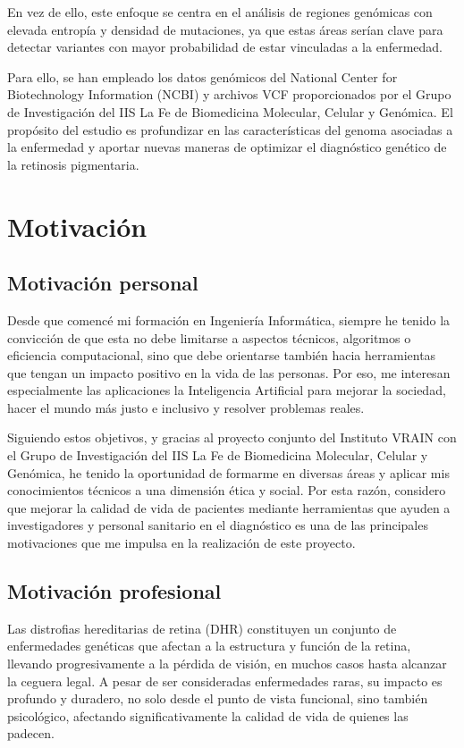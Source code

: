 \documentclass[11pt,spanish,listoffigures,listoftables]{tfgetsinf}
\begin{document}
 

En vez de ello, este enfoque se centra en el análisis de regiones genómicas con elevada entropía y densidad de mutaciones, ya que estas áreas serían clave para detectar variantes con mayor probabilidad de estar vinculadas a la enfermedad. 

 

Para ello, se han empleado los datos genómicos del National Center for Biotechnology Information (NCBI) y archivos VCF proporcionados por el Grupo de Investigación del IIS La Fe de Biomedicina Molecular, Celular y Genómica. El propósito del estudio es profundizar en las características del genoma asociadas a la enfermedad y aportar nuevas maneras de optimizar el diagnóstico genético de la retinosis pigmentaria. 

\section{Motivación}

\subsection{Motivación personal}
Desde que comencé mi formación en Ingeniería Informática, siempre he tenido la convicción de que esta no debe limitarse a aspectos técnicos, algoritmos o eficiencia computacional, sino que debe orientarse también hacia herramientas que tengan un impacto positivo en la vida de las personas. Por eso, me interesan especialmente las aplicaciones la Inteligencia Artificial para mejorar la sociedad, hacer el mundo más justo e inclusivo y resolver problemas reales.  

Siguiendo estos objetivos, y gracias al proyecto conjunto del Instituto VRAIN con el Grupo de Investigación del IIS La Fe de Biomedicina Molecular, Celular y Genómica, he tenido la oportunidad de formarme en diversas áreas y aplicar mis conocimientos técnicos a una dimensión ética y social. Por esta razón, considero que mejorar la calidad de vida de pacientes mediante herramientas que ayuden a investigadores y personal sanitario en el diagnóstico es una de las principales motivaciones que me impulsa en la realización de este proyecto. 

\subsection{Motivación profesional}
Las distrofias hereditarias de retina (DHR) constituyen un conjunto de enfermedades genéticas que afectan a la estructura y función de la retina, llevando progresivamente a la pérdida de visión, en muchos casos hasta alcanzar la ceguera legal. A pesar de ser consideradas enfermedades raras, su impacto es profundo y duradero, no solo desde el punto de vista funcional, sino también psicológico, afectando significativamente la calidad de vida de quienes las padecen\cite{STO}.
\end{document}
